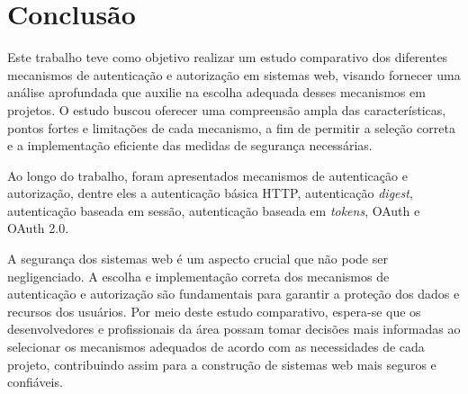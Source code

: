 \section{Conclusão}

Este trabalho teve como objetivo realizar um estudo comparativo dos diferentes mecanismos de 
autenticação e autorização em sistemas web, visando fornecer uma análise aprofundada que auxilie na 
escolha adequada desses mecanismos em projetos. O estudo buscou oferecer uma compreensão ampla das 
características, pontos fortes e limitações de cada mecanismo, a fim de permitir a seleção correta 
e a implementação eficiente das medidas de segurança necessárias.

Ao longo do trabalho, foram apresentados mecanismos de autenticação e autorização, dentre eles a
autenticação básica HTTP, autenticação \emph{digest}, autenticação baseada em sessão, autenticação 
baseada em \emph{tokens}, OAuth e OAuth 2.0.

A segurança dos sistemas web é um aspecto crucial que não pode ser negligenciado. A escolha e 
implementação correta dos mecanismos de autenticação e autorização são fundamentais para garantir 
a proteção dos dados e recursos dos usuários. Por meio deste estudo comparativo, espera-se que os 
desenvolvedores e profissionais da área possam tomar decisões mais informadas ao selecionar os 
mecanismos adequados de acordo com as necessidades de cada projeto, contribuindo assim para a 
construção de sistemas web mais seguros e confiáveis.